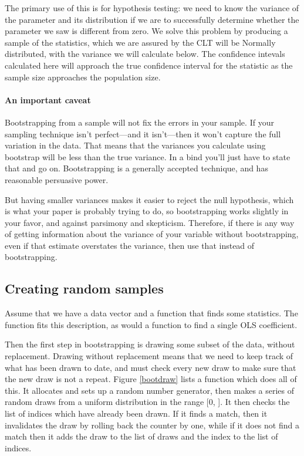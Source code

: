 The primary use of this is for hypothesis testing: we need to know the
variance of the parameter and its distribution if we are to successfully
determine whether the parameter we saw is different from zero. We
solve this problem by producing a sample of the statistics, which we
are assured by the CLT will be Normally distributed, with the variance
we will calculate below. The confidence intevals calculated here will
approach the true confidence interval for the statistic
as the sample size approaches the population size.

\paragraph{An important caveat} Bootstrapping from a sample will not fix
the errors in your sample. If your sampling technique isn't perfect---and
it isn't---then it won't capture the full variation in the data. That
means that the variances you calculate using bootstrap will be less than
the true variance. In a bind you'll just have
to state that and go on. Bootstrapping is a generally accepted technique,
and has reasonable persuasive power.

But having smaller variances makes
it easier to reject the null hypothesis, which is what your paper is
probably trying to do, so bootstrapping works slightly in your favor,
and against parsimony and skepticism. Therefore, if there is any way
of getting information about the variance of your variable without
bootstrapping, even if that estimate overstates the variance, then use
that instead of bootstrapping. 


\subsection{Creating random samples} Assume that we have a
data vector  and a function  that finds some statistics. The
function  fits this description, as would a function to find
a single OLS coefficient.


Then the first step in bootstrapping is drawing some subset of the data,
without replacement. Drawing without replacement means that we need to
keep track of what has been drawn to date, and must check every new draw
to make sure that the new draw is not a repeat. Figure \ref{bootdraw} lists a function which
does all of this. It allocates and sets up a random number generator, then
makes a series of random draws from a uniform distribution in the range
[0, ]. It then checks the list of indices which have
already been drawn. If it finds a match, then it invalidates the draw
by rolling back the counter by one, while if it does not find a match then it
adds the draw to the list of draws and the index to the list of indices.


